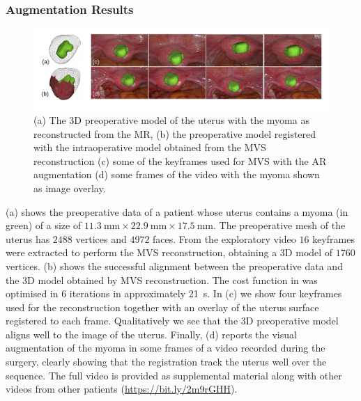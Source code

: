 \subsubsection{Augmentation Results}
\begin{figure}[t]
  \centering
  \includegraphics[width=\textwidth]{./figs/frames_aug_new.pdf}
\caption{(a) The 3D preoperative model of the uterus with the  myoma as reconstructed from the MR, (b) the preoperative model registered with the intraoperative model obtained from the MVS reconstruction (c) some of the keyframes used for MVS with the AR augmentation  (d) some frames of the video with the myoma shown as image overlay.}
\label{fig:myomas}
\end{figure}
(a) shows the preoperative data of a patient whose uterus contains a myoma (in green) of a size of $\SI{11.3}{\milli\metre}\times\SI{22.9}{\milli\metre}\times\SI{17.5}{\milli\metre}$. The preoperative mesh of the uterus has $2488$ vertices and $4972$ faces. 
From the exploratory video $16$ keyframes were extracted to perform the MVS reconstruction, obtaining a 3D model of $1760$ vertices.
(b) shows the successful alignment between the preoperative data and the 3D model obtained by MVS reconstruction. The cost function in  was optimised in $6$ iterations in approximately \SI{21}{\second}. 
In (c) we show four keyframes used for the reconstruction together with an overlay of the uterus surface registered to each frame. Qualitatively we see that the 3D preoperative model aligns well to the image of the uterus.
Finally, (d) reports the visual augmentation of the myoma in some frames of a video recorded during the surgery, clearly showing that the registration track the uterus well over the sequence. 
The full video is provided as supplemental material along with other videos from other patients (\url{https://bit.ly/2m9rGHH}).


